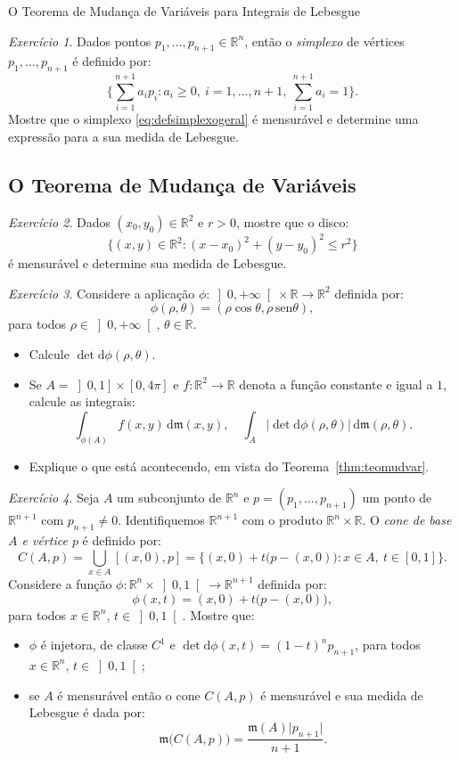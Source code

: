 \documentclass[oneside,final,11pt]{amsbook}
\newcommand{\R}{\mathds R}
\newcommand{\leb}{\mathfrak m}
\newcommand{\dd}{\mathrm d}
\newcommand{\sen}{\mathrm{sen}}
\theoremstyle{remark}\newtheorem{exercise}{Exercício}[chapter]
\theoremstyle{remark}\newtheorem{*exercise}[exercise]{\hbox to 0pt{\hskip 0pt minus 1fil*}Exercício}
\theoremstyle{definition}\newtheorem{exdefin}{Definição}[chapter]
\theoremstyle{plain}\newtheorem{teo}{Teorema}[section]
\theoremstyle{plain}\newtheorem{lem}[teo]{Lema}
\theoremstyle{plain}\newtheorem{prop}[teo]{Proposição}
\theoremstyle{plain}\newtheorem{cor}[teo]{Corolário}
\theoremstyle{definition}\newtheorem{defin}[teo]{Definição}
\theoremstyle{remark}\newtheorem{rem}[teo]{Observação}
\theoremstyle{definition}\newtheorem{notation}[teo]{Notação}
\theoremstyle{definition}\newtheorem{convention}[teo]{Convenção}
\theoremstyle{definition}\newtheorem{example}[teo]{Exemplo}
\numberwithin{section}{chapter}
\numberwithin{equation}{section}
\begin{document}
\begin{chapter}{O Teorema de Mudança de Variáveis para Integrais de Lebesgue}
\begin{exercise}
Dados pontos $p_1,\ldots,p_{n+1}\in\R^n$, então o {\em simplexo\/}
de vértices $p_1,\ldots,p_{n+1}$ é definido por:
\begin{equation}\label{eq:defsimplexogeral}
\Big\{\sum_{i=1}^{n+1}a_ip_i:a_i\ge0,\ i=1,\ldots,n+1,\ \sum_{i=1}^{n+1}a_i=1\Big\}.
\end{equation}
Mostre que o simplexo \eqref{eq:defsimplexogeral} é mensurável e determine
uma expressão para a sua medida de Lebesgue.
\end{exercise}

\subsection*{O Teorema de Mudança de Variáveis}

\begin{exercise}
Dados $(x_0,y_0)\in\R^2$ e $r>0$, mostre que o disco:
\[\big\{(x,y)\in\R^2:(x-x_0)^2+(y-y_0)^2\le r^2\big\}\]
é mensurável e determine sua medida de Lebesgue.
\end{exercise}

\begin{exercise}
Considere a aplicação $\phi:\left]0,+\infty\right[\times\R\to\R^2$ definida por:
\[\phi(\rho,\theta)=(\rho\cos\theta,\rho\,\sen\theta),\]
para todos $\rho\in\left]0,+\infty\right[$, $\theta\in\R$.
\begin{itemize}
\item Calcule $\det\dd\phi(\rho,\theta)$.
\item Se $A=\left]0,1\right]\times[0,4\pi]$ e $f:\R^2\to\R$ denota a função constante
e igual a $1$, calcule as integrais:
\[\int_{\phi(A)}f(x,y)\,\dd\leb(x,y),\quad
\int_A\big\vert\det\dd\phi(\rho,\theta)\big\vert\,\dd\leb(\rho,\theta).\]
\item Explique o que está acontecendo, em vista do Teorema~\ref{thm:teomudvar}.
\end{itemize}
\end{exercise}

\begin{exercise}
Seja $A$ um subconjunto de $\R^n$ e $p=(p_1,\ldots,p_{n+1})$ um ponto de $\R^{n+1}$
com $p_{n+1}\ne0$. Identifiquemos $\R^{n+1}$ com o produto $\R^n\times\R$.
O {\em cone de base $A$ e vértice $p$\/}
é definido por:
\[C(A,p)=\bigcup_{x\in A}[(x,0),p]=\big\{(x,0)+t\big(p-(x,0)\big):x\in A,\ t\in[0,1]\big\}.\]
Considere a função $\phi:\R^n\times\left]0,1\right[\to\R^{n+1}$
definida por:
\[\phi(x,t)=(x,0)+t\big(p-(x,0)\big),\]
para todos $x\in\R^n$, $t\in\left]0,1\right[$. Mostre que:
\begin{itemize}
\item $\phi$ é injetora, de classe $C^1$ e $\det\dd\phi(x,t)=(1-t)^np_{n+1}$,
para todos $x\in\R^n$, $t\in\left]0,1\right[$;
\item se $A$ é mensurável então o cone $C(A,p)$ é mensurável e sua medida de Lebesgue
é dada por:
\[\leb\big(C(A,p)\big)=\frac{\leb(A)\vert p_{n+1}\vert}{n+1}.\]
\end{itemize}
\end{exercise}


\end{chapter}
\end{document}
